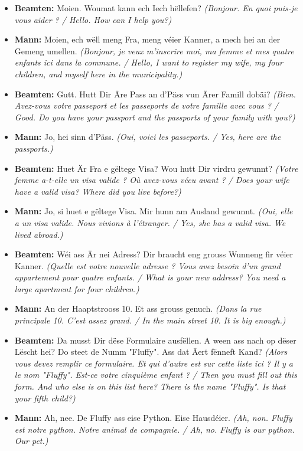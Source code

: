 \begin{itemize}
    \item \textbf{Beamten:} Moien. Woumat kann ech Iech hëllefen? \textit{(Bonjour. En quoi puis-je vous aider ? / Hello. How can I help you?)}
    \item \textbf{Mann:} Moien, ech wëll meng Fra, meng véier Kanner, a mech hei an der Gemeng umellen. \textit{(Bonjour, je veux m'inscrire moi, ma femme et mes quatre enfants ici dans la commune. / Hello, I want to register my wife, my four children, and myself here in the municipality.)}
    \item \textbf{Beamten:} Gutt. Hutt Dir Äre Pass an d'Päss vun Ärer Famill dobäi? \textit{(Bien. Avez-vous votre passeport et les passeports de votre famille avec vous ? / Good. Do you have your passport and the passports of your family with you?)}
    \item \textbf{Mann:} Jo, hei sinn d'Päss. \textit{(Oui, voici les passeports. / Yes, here are the passports.)}
    \item \textbf{Beamten:} Huet Är Fra e gëltege Visa? Wou hutt Dir virdru gewunnt? \textit{(Votre femme a-t-elle un visa valide ? Où avez-vous vécu avant ? / Does your wife have a valid visa? Where did you live before?)}
    \item \textbf{Mann:} Jo, si huet e gëltege Visa. Mir hunn am Ausland gewunnt. \textit{(Oui, elle a un visa valide. Nous vivions à l'étranger. / Yes, she has a valid visa. We lived abroad.)}
    \item \textbf{Beamten:} Wéi ass Är nei Adress? Dir braucht eng grouss Wunneng fir véier Kanner. \textit{(Quelle est votre nouvelle adresse ? Vous avez besoin d'un grand appartement pour quatre enfants. / What is your new address? You need a large apartment for four children.)}
    \item \textbf{Mann:} An der Haaptstrooss 10. Et ass grouss genuch. \textit{(Dans la rue principale 10. C'est assez grand. / In the main street 10. It is big enough.)}
    \item \textbf{Beamten:} Da musst Dir dëse Formulaire ausfëllen. A ween ass nach op dëser Lëscht hei? Do steet de Numm "Fluffy". Ass dat Äert fënneft Kand? \textit{(Alors vous devez remplir ce formulaire. Et qui d'autre est sur cette liste ici ? Il y a le nom "Fluffy". Est-ce votre cinquième enfant ? / Then you must fill out this form. And who else is on this list here? There is the name "Fluffy". Is that your fifth child?)}
    \item \textbf{Mann:} Ah, nee. De Fluffy ass eise Python. Eise Hausdéier. \textit{(Ah, non. Fluffy est notre python. Notre animal de compagnie. / Ah, no. Fluffy is our python. Our pet.)}

\end{itemize}
